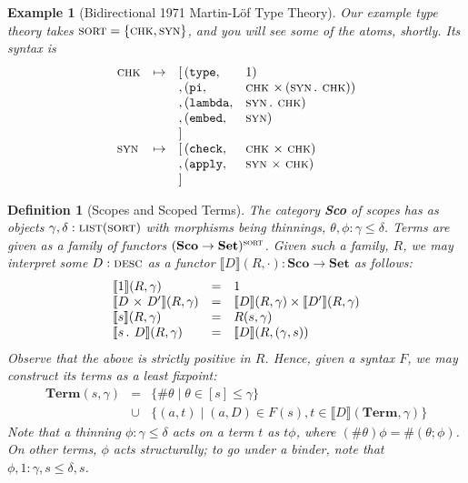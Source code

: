 \documentclass[format=acmsmall, screen, review, anonymous, timestamp]{acmart}
\newtheorem{defn}[thm]{Definition}
\newtheorem{eg}[thm]{Example}
\begin{document}
\begin{eg}[Bidirectional 1971 Martin-L\"of Type Theory]
  Our example type theory takes $\textsc{sort} = \{\textsc{chk},\textsc{syn}\}$, and you will see some of the atoms, shortly. Its syntax is
  \[\begin{array}{lcr@{\,}ll}
      \syso{chk} & \mapsto & [ & (\mathtt{type},     & \red{1}) \\
                 &         & , & (\mathtt{pi},       & \syso{chk} \dx (\syso{syn}\mathop{\red{.}\:}\syso{chk})) \\
                 &         & , & (\mathtt{lambda},   & \syso{syn}\db\syso{chk}) \\
                 &         & , & (\mathtt{embed},    & \syso{syn}) \\
                 &         & ] \\
      \syso{syn} & \mapsto & [ & (\mathtt{check},    & \syso{chk} \dx \syso{chk}) \\
                 &         & , & (\mathtt{apply},    & \syso{syn} \dx \syso{chk}) \\
                 &         & ]
  \end{array}\]
\end{eg}

\newcommand{\sem}[1]{\llbracket #1 \rrbracket}
\newcommand{\st}{\mathrel{\mid}}
\begin{defn}[Scopes and Scoped Terms]
  The category \textbf{Sco} of scopes has as objects $\gamma,\delta : \textsc{list}(\textsc{sort})$ with
  morphisms being thinnings, $\theta,\phi : \gamma \le \delta$. Terms are given as a
  family of functors $(\textbf{Sco}\to\textbf{Set})^{\textsc{sort}}$. Given such a family, $R$, we may interpret
  some $D:\textsc{desc}$ as a functor $\llbracket D \rrbracket(R,\cdot) : \textbf{Sco}\to\textbf{Set}$ as follows:
  \[\begin{array}{lcl}
      \sem{\red{1}}(R,\gamma) & = & 1 \\
      \sem{D\dx D'}(R,\gamma) & = & \sem{D}(R,\gamma) \times \sem{D'}(R,\gamma) \\
      \sem{s}(R,\gamma) & = & R(s,\gamma) \\
      \sem{s\db D}(R,\gamma) & = & \sem{D}(R, (\gamma, s))
    \end{array}\]
  Observe that the above is strictly positive in $R$. Hence, given a
  syntax $F$, we may construct its terms as a least fixpoint:
  \[\begin{array}{rcl}
    \textbf{Term}(s, \gamma) &=& \{\#\theta\st\theta\in[s]\le
                                 \gamma\}\\
                             &\cup& \{(a,t) \st (a,D)\in F(s), t\in\sem{D}(\textbf{Term},\gamma)\}
  \end{array}\]
  Note that a thinning $\phi:\gamma\le\delta$ acts on a term $t$ as $t\phi$, where $(\#\theta)\phi = \#(\theta;\phi)$. On other terms,
  $\phi$ acts structurally; to go under a binder, note that $\phi,1:\gamma,s\le\delta,s$.
\end{defn}
\end{document}
